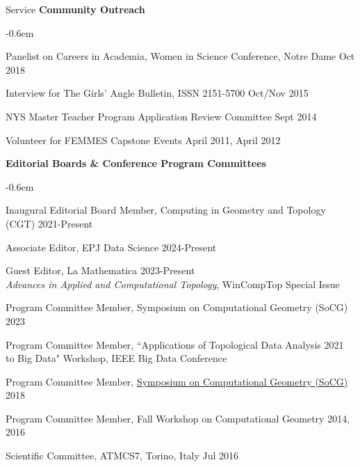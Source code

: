 \documentclass{resume} %
\begin{document}
\begin{rSection}{Service}
\textbf{Community Outreach}
\begin{list}{}{\leftmargin=1em}
   \itemsep -0.6em \vspace{-0.5em} %
\item
Panelist on Careers in Academia, Women in Science Conference, Notre Dame \hfill Oct 2018
\item Interview for The Girls' Angle Bulletin,  ISSN 2151-5700 \hfill Oct/Nov 2015
\item
{NYS Master Teacher Program Application Review Committee} \hfill Sept 2014
\item
{Volunteer for FEMMES  Capstone Events} \hfill April 2011, April 2012
\end{list}

\textbf{Editorial Boards \& Conference Program Committees}

\begin{list}{}{\leftmargin=1em}
   \itemsep -0.6em \vspace{-0.5em} %
   \item Inaugural Editorial Board Member, Computing in Geometry and Topology (CGT)  \hfill 2021-Present
   \item Associate Editor, EPJ Data Science \hfill 2024-Present
   \item Guest Editor, La Mathematica \hfill 2023-Present\\ 
   \phantom{MMM}\textit{Advances in Applied and Computational Topology}, WinCompTop Special Issue 
\item
Program Committee Member, Symposium on Computational Geometry (SoCG) \hfill 2023
\item
Program Committee Member, ``Applications of Topological Data Analysis \hfill 2021\\
\phantom{MMM}to Big Data" Workshop, IEEE Big Data Conference
\item
Program Committee Member, \href{https://www.renyi.hu/conferences/socg18/}{Symposium on Computational Geometry (SoCG)} \hfill 2018
\item {Program Committee Member, Fall Workshop on Computational Geometry} \hfill 2014, 2016
\item
{Scientific Committee,
ATMCS7, Torino, Italy} \hfill Jul 2016\\
 \phantom{MMM}{Applied Topology: Methods, Computation, and Science}
\end{list}





\end{rSection}
\end{document}
